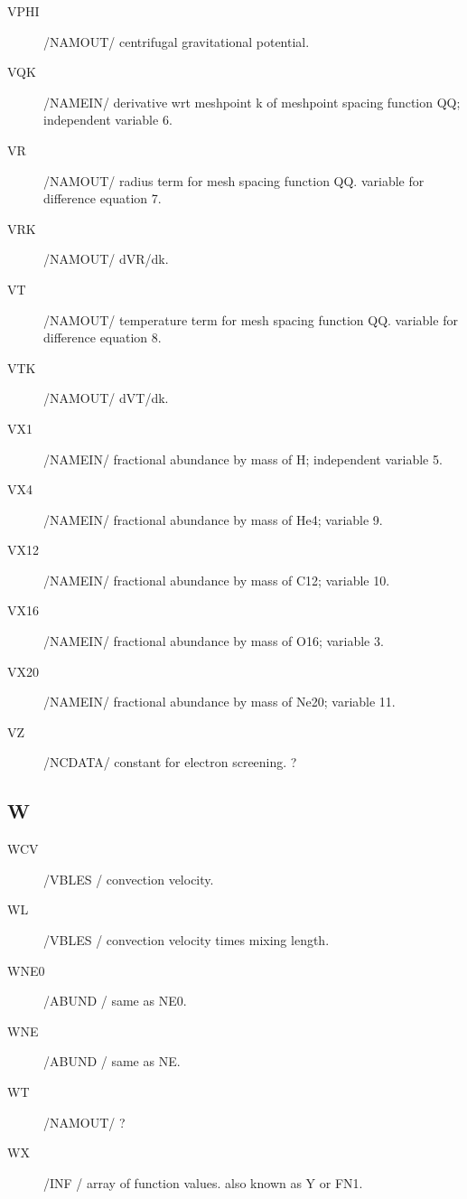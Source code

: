 \documentclass{article}
\begin{document}
\begin{description}
	\item[VPHI]    	/NAMOUT/ centrifugal gravitational potential.

	\item[VQK]		    /NAMEIN/ derivative wrt meshpoint k of meshpoint spacing function QQ;
	                     independent variable 6.

	\item[VR]      	/NAMOUT/ radius term for mesh spacing function QQ.  variable for difference equation 7.

	\item[VRK]     	/NAMOUT/ dVR/dk.

	\item[VT]      	/NAMOUT/ temperature term for mesh spacing function QQ.  variable for difference equation 8.

	\item[VTK]     	/NAMOUT/ dVT/dk.

	\item[VX1]		    /NAMEIN/ fractional abundance by mass of H;  independent variable 5.

	\item[VX4]		    /NAMEIN/ fractional abundance by mass of He4; variable 9.

	\item[VX12]		/NAMEIN/ fractional abundance by mass of C12;  variable 10.

	\item[VX16]		/NAMEIN/ fractional abundance by mass of O16; variable 3.

	\item[VX20]		/NAMEIN/ fractional abundance by mass of Ne20; variable 11.

	\item[VZ]		    /NCDATA/ constant for electron screening.   ?

\end{description}
\subsection*{W}
\begin{description}

    \item[WCV]     	/VBLES / convection velocity.

	\item[WL]		    /VBLES / convection velocity times mixing length.

	\item[WNE0]		/ABUND / same as NE0.

	\item[WNE]		    /ABUND / same as NE.

	\item[WT]      	/NAMOUT/   ?

	\item[WX]		    /INF   / array of function values. also known as Y or FN1.

\end{description}
\end{document}
